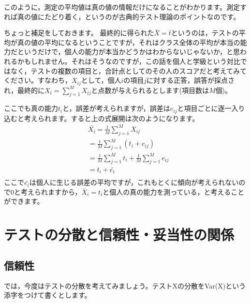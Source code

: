 \documentclass{ltjbook}
\begin{document}
このように，測定の平均値は真の値の情報だけになることがわかります。測定すれば真の値にたどり着く，というのが古典的テスト理論のポイントなのです。

ちょっと補足をしておきます。
最終的に得られた$\bar{X} = \bar{t}$というのは，テストの平均が真の値の平均になるということですが，それはクラス全体の平均が本当の能力だというだけで，個人の能力が本当かどうかはわからないじゃないか，と思われるかもしれません。それはそうなのですが，この話を個人と学級という対比ではなく，テストの複数の項目と，合計点としてのその人のスコアだと考えてみてください。すなわち，$X_{ij}$として，個人$i$の項目$j$に対する正答，誤答が採点され，最終的に$X_i = \sum_{j=1}^M X_{ij}$と点数が与えられるとします(項目数は$M$個)。

ここでも真の能力$t_i$と，誤差が考えられますが，誤差は$e_{ij}$と項目ごとに逐一入り込むと考えられます。すると上の式展開は次のようになります。
\begin{align*}
	 & \bar{X_i}  =  \frac{1}{M}\sum_{j=1}^M X_{ij}                    \\
	 & =  \frac{1}{M}\sum_{j=1}^M (t_i + e_{ij})                       \\
	 & =  \frac{1}{M}\sum_{j=1}^M t_i + \frac{1}{M}\sum_{j=1}^M e_{ij} \\
	 & =  t_i + \bar{e_{i}}                                            \\
\end{align*}
ここで$\bar{e_i}$は個人に生じる誤差の平均ですが，これもとくに傾向が考えられないので$0$と考えられますから，$\bar{X}_i = t_i $と個人の真の能力を測っている，と考えることができます。

\section{テストの分散と信頼性・妥当性の関係}
\subsection{信頼性}
では，今度はテストの分散を考えてみましょう。テストXの分散をVar(X)という添字をつけて書くとします。
\end{document}
